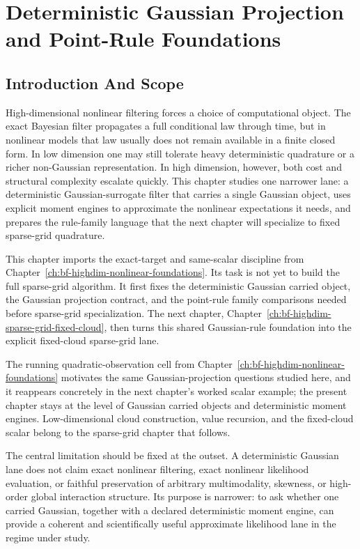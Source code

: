 \chapter{Deterministic Gaussian Projection and Point-Rule Foundations}
\label{ch:bf-highdim-gaussian-point-rule-foundations}
\providecommand{\widehatell}{\widehat{\ell}}
\providecommand{\dotwidehatell}{\dot{\widehat{\ell}}}
\providecommand{\dd}{\,\mathrm d}

\section{Introduction And Scope}
\label{sec:bf-hd-gq-intro}

High-dimensional nonlinear filtering forces a choice of computational object.
The exact Bayesian filter propagates a full conditional law through time, but in
nonlinear models that law usually does not remain available in a finite closed
form.  In low dimension one may still tolerate heavy deterministic quadrature or
a richer non-Gaussian representation.  In high dimension, however, both cost and
structural complexity escalate quickly.  This chapter studies one narrower lane:
a deterministic Gaussian-surrogate filter that carries a single Gaussian object,
uses explicit moment engines to approximate the nonlinear expectations it needs,
and prepares the rule-family language that the next chapter will specialize to
fixed sparse-grid quadrature.

This chapter imports the exact-target and same-scalar discipline from
Chapter~\ref{ch:bf-highdim-nonlinear-foundations}.  Its task is not yet to build
the full sparse-grid algorithm.  It first fixes the deterministic Gaussian
carried object, the Gaussian projection contract, and the point-rule family
comparisons needed before sparse-grid specialization.  The next chapter,
Chapter~\ref{ch:bf-highdim-sparse-grid-fixed-cloud}, then turns this shared
Gaussian-rule foundation into the explicit fixed-cloud sparse-grid lane.

The running quadratic-observation cell from
Chapter~\ref{ch:bf-highdim-nonlinear-foundations} motivates the same
Gaussian-projection questions studied here, and it reappears concretely in the
next chapter's worked scalar example; the present chapter stays at the level of
Gaussian carried objects and deterministic moment engines.  Low-dimensional cloud construction,
value recursion, and the fixed-cloud scalar belong to the sparse-grid chapter
that follows.

The central limitation should be fixed at the outset.  A deterministic Gaussian
lane does not claim exact nonlinear filtering, exact nonlinear likelihood
evaluation, or faithful preservation of arbitrary multimodality, skewness, or
high-order global interaction structure.  Its purpose is narrower: to ask
whether one carried Gaussian, together with a declared deterministic moment
engine, can provide a coherent and scientifically useful approximate likelihood
lane in the regime under study.

